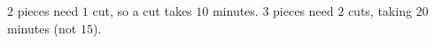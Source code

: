 $2$ pieces need $1$ cut, so a cut takes $10$ minutes. $3$ pieces need $2$ cuts, taking $\boxed{20}$ minutes (not $15$).
